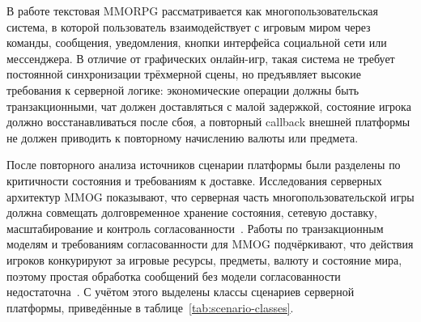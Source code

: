 \documentclass[a4paper,14pt]{extarticle}
\numberwithin{figure}{section}
\numberwithin{table}{section}
\begin{document}
В работе текстовая MMORPG рассматривается как многопользовательская система, в которой пользователь взаимодействует с игровым миром через команды, сообщения, уведомления, кнопки интерфейса социальной сети или мессенджера. В отличие от графических онлайн-игр, такая система не требует постоянной синхронизации трёхмерной сцены, но предъявляет высокие требования к серверной логике: экономические операции должны быть транзакционными, чат должен доставляться с малой задержкой, состояние игрока должно восстанавливаться после сбоя, а повторный callback внешней платформы не должен приводить к повторному начислению валюты или предмета.

После повторного анализа источников сценарии платформы были разделены по критичности состояния и требованиям к доставке. Исследования серверных архитектур MMOG показывают, что серверная часть многопользовательской игры должна совмещать долговременное хранение состояния, сетевую доставку, масштабирование и контроль согласованности~\cite{kasenides2019mmog,zhang2008persistence}. Работы по транзакционным моделям и требованиям согласованности для MMOG подчёркивают, что действия игроков конкурируют за игровые ресурсы, предметы, валюту и состояние мира, поэтому простая обработка сообщений без модели согласованности недостаточна~\cite{zhang2011transactions,palant2006consistency,li2004continuous,diao2013consistency}. С учётом этого выделены классы сценариев серверной платформы, приведённые в таблице~\ref{tab:scenario-classes}.
\end{document}
